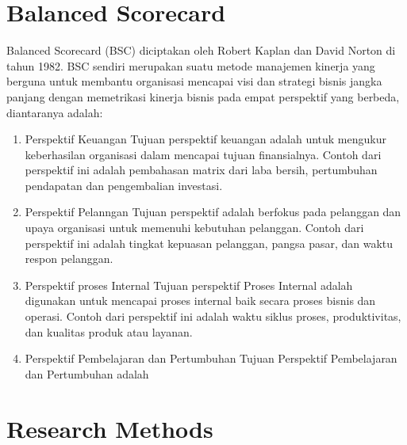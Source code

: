 \documentclass[conference]{IEEEtran}
\begin{document}
\section{Balanced Scorecard}
Balanced Scorecard (BSC) diciptakan oleh Robert Kaplan dan David Norton di tahun 1982. BSC sendiri merupakan suatu metode manajemen kinerja yang berguna untuk membantu organisasi mencapai visi dan strategi bisnis jangka panjang dengan memetrikasi kinerja bisnis pada empat perspektif yang berbeda, diantaranya adalah:
\begin{enumerate}
\item Perspektif Keuangan 
Tujuan perspektif keuangan adalah untuk mengukur keberhasilan organisasi dalam mencapai tujuan finansialnya. Contoh dari perspektif ini adalah pembahasan matrix dari laba bersih, pertumbuhan pendapatan dan pengembalian investasi.
\item Perspektif Pelanngan 
Tujuan perspektif adalah berfokus pada pelanggan dan upaya organisasi untuk memenuhi kebutuhan pelanggan. Contoh dari perspektif ini adalah tingkat kepuasan pelanggan, pangsa pasar, dan waktu respon pelanggan.
\item Perspektif proses Internal
Tujuan perspektif Proses Internal adalah digunakan untuk mencapai proses internal baik secara proses bisnis dan operasi. Contoh dari perspektif ini adalah waktu siklus proses, produktivitas, dan kualitas produk atau layanan.
\item Perspektif Pembelajaran dan Pertumbuhan
Tujuan Perspektif Pembelajaran dan Pertumbuhan adalah 
\end{enumerate}

\section{Research Methods}
\end{document}
